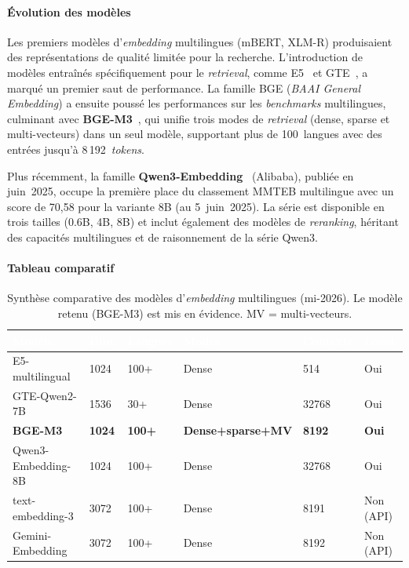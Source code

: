 \documentclass[11pt,a4paper]{article}
\begin{document}
\paragraph{Évolution des modèles}

Les premiers modèles d'\textit{embedding} multilingues (mBERT, XLM-R) produisaient des représentations de qualité limitée pour la recherche. L'introduction de modèles entraînés spécifiquement pour le \textit{retrieval}, comme E5~\cite{wang2024e5} et GTE~\cite{li2023gte}, a marqué un premier saut de performance. La famille BGE (\textit{BAAI General Embedding}) a ensuite poussé les performances sur les \textit{benchmarks} multilingues, culminant avec \textbf{BGE-M3}~\cite{chen2024bgem3}, qui unifie trois modes de \textit{retrieval} (dense, sparse et multi-vecteurs) dans un seul modèle, supportant plus de 100~langues avec des entrées jusqu'à 8\,192~\textit{tokens}.

Plus récemment, la famille \textbf{Qwen3-Embedding}~\cite{zhang2025qwen3embedding} (Alibaba), publiée en juin~2025, occupe la première place du classement MMTEB multilingue avec un score de 70,58 pour la variante 8B (au 5~juin~2025). La série est disponible en trois tailles (0.6B, 4B, 8B) et inclut également des modèles de \textit{reranking}, héritant des capacités multilingues et de raisonnement de la série Qwen3.

\paragraph{Tableau comparatif}

\begin{table}[H]
\centering
\small
\begin{tabularx}{\linewidth}{L{3cm} C{1.3cm} C{1.3cm} C{2.2cm} C{1.5cm} C{1.5cm}}
\toprule
{}
\textcolor{white}{\textbf{Modèle}} &
\textcolor{white}{\textbf{Dim.}} &
\textcolor{white}{\textbf{Langues}} &
\textcolor{white}{\textbf{Modes}} &
\textcolor{white}{\textbf{Contexte}} &
\textcolor{white}{\textbf{Local}} \\
\midrule
E5-multilingual       & 1024 & 100+  & Dense      & 514   & Oui \\
GTE-Qwen2-7B          & 1536 & 30+   & Dense      & 32768 & Oui \\
\textbf{BGE-M3}       & \textbf{1024} & \textbf{100+} & \textbf{Dense+sparse+MV} & \textbf{8192} & \textbf{Oui} \\
Qwen3-Embedding-8B    & 1024 & 100+  & Dense      & 32768 & Oui \\
text-embedding-3      & 3072 & 100+  & Dense      & 8191  & Non (API) \\
Gemini-Embedding      & 3072 & 100+  & Dense      & 8192  & Non (API) \\
\bottomrule
\end{tabularx}
\caption{Synthèse comparative des modèles d'\textit{embedding} multilingues (mi-2026). Le modèle retenu (BGE-M3) est mis en évidence. MV = multi-vecteurs.}
\label{tab:embedding}
\end{table}
\end{document}
